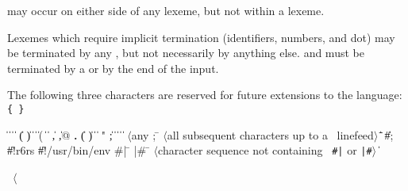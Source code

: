  may occur on either side of any lexeme, but not
within a lexeme.

\vest Lexemes which require implicit termination (identifiers, numbers,
and dot) may be terminated by any , but not
necessarily by anything else.   and 
must be terminated by a  or by the end of the input.

The following three characters are reserved for future extensions to the
language: {\tt \verb"{" \verb"}"}

\begin{grammar}%
 \:  \|  \| 
\>  \|  \| 
\>  \| ( \| ) \| \openbracket{} \| \closedbracket{} \| \sharpsign( \| \singlequote{} \| \backquote{} \| , \| ,@ \| {\bf.}
 \:  \| ( \| ) \| \openbracket{} \| \closedbracket{} " \| ;
 \:  \| 
\> \|  \|  
\> \| 
 \: $\langle${\rm any }
\> 
 \: ; \= $\langle$\rm all subsequent characters up to a
		    \>\ \rm linefeed$\rangle$
\qquad \= \| 
\> \| \#; 
\> \| \#!r6rs \| \#!/usr/bin/env
 \: \#| \= 
\>  |\#
 \: \= $\langle$\rm character sequence not containing
\>\ \rm {\tt \#|} or {\tt |\#}$\rangle$
 \:  
 \:  \| 
 \: %
\end{grammar}

\label{extendedalphas}
\label{identifiersyntax}

\hbox{\cf{} \goesto{} $\langle$}

